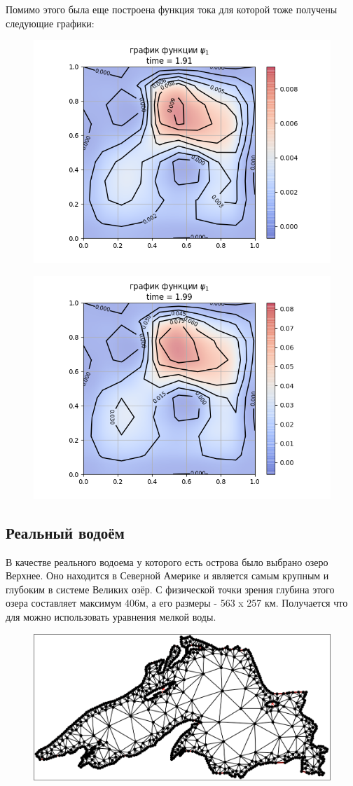 \documentclass[14pt]{extreport}
\begin{document}
Помимо этого была еще построена функция тока для которой тоже получены следующие графики:

\begin{figure}[H]
\centerline{
\includegraphics[width=0.5\linewidth]{images/ex3/psi/91}}
\caption{}
\label{img:ex3:psi:91}
\end{figure}

\begin{figure}[H]
\centerline{
\includegraphics[width=0.5\linewidth]{images/ex3/psi/99}}
\caption{}
\label{img:ex3:psi:99}
\end{figure}


\subsection{Реальный водоём}
В качестве реального водоема у которого есть острова было выбрано озеро Верхнее. Оно находится в Северной Америке и является самым крупным и глубоким в системе Великих озёр. С физической точки зрения глубина этого озера составляет максимум 406м, а его размеры - 563 x 257 км. Получается что для можно использовать уравнения мелкой воды.

\begin{figure}[H]
\centerline{
\includegraphics[width=0.5\linewidth]{images/ex4/mesh}}
\caption{}
\label{img:ex4:mesh}
\end{figure}
\end{document}
